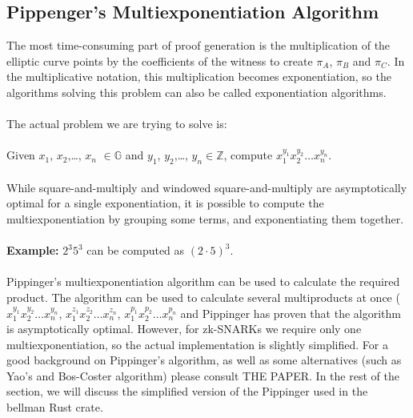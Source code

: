 \subsection{Pippenger's Multiexponentiation Algorithm}
The most time-consuming part of proof generation is the multiplication of the elliptic curve points by the coefficients of the witness to create $\pi_A$, $\pi_B$ and $\pi_C$. In the multiplicative notation, this multiplication becomes exponentiation, so the algorithms solving this problem can also be called exponentiation algorithms.\\
\\
The actual problem we are trying to solve is:\\
\\
Given $x_1$, $x_2$,\dots, $x_n$ $\in \mathbb{G}$ and $y_1$, $y_2$,\dots, $y_n \in \mathbb{Z}$, compute $x_1^{y_1} x_2^{y_2} \dots x_n^{y_n}$.\\
\\
While square-and-multiply and windowed square-and-multiply are asymptotically optimal for a single exponentiation, it is possible to compute the multiexponentiation by grouping some terms, and exponentiating them together.\\
\\
\textbf{Example:} $2^3 5^3$ can be computed as $(2 \cdot 5)^3$.\\
\\
Pippinger's multiexponentiation algorithm can be used to calculate the required product. The algorithm can be used to calculate several multiproducts at once ($x_1^{y_1} x_2^{y_2} \dots x_n^{y_n}$, $x_1^{z_1} x_2^{z_2} \dots x_n^{z_n}$, $x_1^{p_1} x_2^{p_2} \dots x_n^{p_n}$ and Pippinger has proven that the algorithm is asymptotically optimal. However, for zk-SNARKs we require only one multiexponentiation, so the actual implementation is slightly simplified. For a good background on Pippinger's algorithm, as well as some alternatives (such as Yao's and Bos-Coster algorithm) please consult THE PAPER. In the rest of the section, we will discuss the simplified version of the Pippinger used in the bellman Rust crate.
